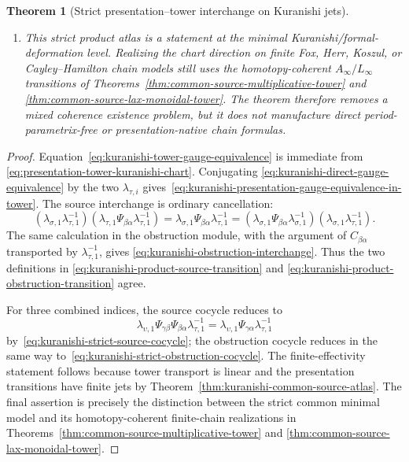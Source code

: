 \documentclass[11pt]{article}
\newtheorem{theorem}{Theorem}[section]
\theoremstyle{definition}
\begin{document}
\begin{theorem}[Strict presentation--tower interchange on Kuranishi jets]
\begin{enumerate}[label=\textnormal{(\roman*)}]
\item This strict product atlas is a statement at the minimal
Kuranishi/formal-deformation level.  Realizing the chart direction on finite
Fox, Herr, Koszul, or Cayley--Hamilton chain models still
uses the homotopy-coherent $A_\infty/L_\infty$ transitions of
Theorems~\ref{thm:common-source-multiplicative-tower} and
\ref{thm:common-source-lax-monoidal-tower}.  The theorem therefore removes a
mixed coherence existence problem, but it does not manufacture direct
period-parametrix-free or presentation-native chain formulas.
\end{enumerate}
\end{theorem}

\begin{proof}
Equation~\eqref{eq:kuranishi-tower-gauge-equivalence} is immediate from
\eqref{eq:presentation-tower-kuranishi-chart}.  Conjugating
\eqref{eq:kuranishi-direct-gauge-equivalence} by the two $\lambda_{\tau,i}$
gives~\eqref{eq:kuranishi-presentation-gauge-equivalence-in-tower}.
The source interchange is ordinary cancellation:
\[
 (\lambda_{\sigma,1}\lambda_{\tau,1}^{-1})
 (\lambda_{\tau,1}\Psi_{\beta\alpha}\lambda_{\tau,1}^{-1})
 =\lambda_{\sigma,1}\Psi_{\beta\alpha}\lambda_{\tau,1}^{-1}
 =
 (\lambda_{\sigma,1}\Psi_{\beta\alpha}\lambda_{\sigma,1}^{-1})
 (\lambda_{\sigma,1}\lambda_{\tau,1}^{-1}).
\]
The same calculation in the obstruction module, with the argument of
$C_{\beta\alpha}$ transported by $\lambda_{\tau,1}^{-1}$, gives
\eqref{eq:kuranishi-obstruction-interchange}.  Thus the two definitions in
\eqref{eq:kuranishi-product-source-transition} and
\eqref{eq:kuranishi-product-obstruction-transition} agree.

For three combined indices, the source cocycle reduces to
\[
 \lambda_{\upsilon,1}
 \Psi_{\gamma\beta}\Psi_{\beta\alpha}
 \lambda_{\tau,1}^{-1}
 =\lambda_{\upsilon,1}\Psi_{\gamma\alpha}\lambda_{\tau,1}^{-1}
\]
by~\eqref{eq:kuranishi-strict-source-cocycle}; the obstruction cocycle reduces
in the same way to~\eqref{eq:kuranishi-strict-obstruction-cocycle}.  The
finite-effectivity statement follows because tower transport is linear and
the presentation transitions have finite jets by
Theorem~\ref{thm:kuranishi-common-source-atlas}.  The final assertion is
precisely the distinction between the strict common minimal model and its
homotopy-coherent finite-chain realizations in
Theorems~\ref{thm:common-source-multiplicative-tower} and
\ref{thm:common-source-lax-monoidal-tower}.
\end{proof}
\end{document}
